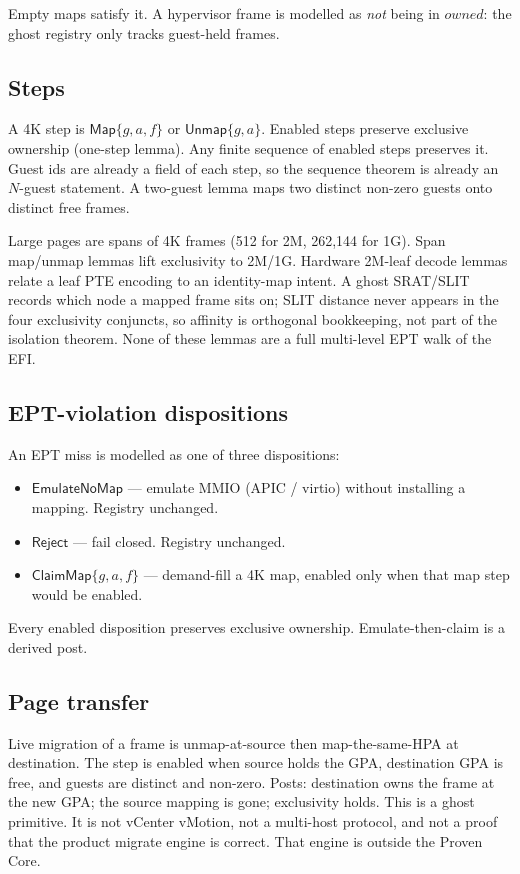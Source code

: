 \documentclass[sigplan,10pt,anonymous]{acmart}
\begin{document}
Empty maps satisfy it. A hypervisor frame is modelled as \emph{not} being
in $\mathit{owned}$: the ghost registry only tracks guest-held frames.

\subsection{Steps}

A 4K step is $\mathsf{Map}\{g,a,f\}$ or $\mathsf{Unmap}\{g,a\}$. Enabled
steps preserve exclusive ownership (one-step lemma). Any finite sequence of
enabled steps preserves it. Guest ids are already a field of each step, so
the sequence theorem is already an $N$-guest statement. A two-guest lemma
maps two distinct non-zero guests onto distinct free frames.

Large pages are spans of 4K frames (512 for 2M, 262{,}144 for 1G). Span
map/unmap lemmas lift exclusivity to 2M/1G. Hardware 2M-leaf decode lemmas
relate a leaf PTE encoding to an identity-map intent. A ghost SRAT/SLIT
records which node a mapped frame sits on; SLIT distance never appears in
the four exclusivity conjuncts, so affinity is orthogonal bookkeeping, not
part of the isolation theorem. None of these lemmas are a full multi-level
EPT walk of the EFI.

\subsection{EPT-violation dispositions}

An EPT miss is modelled as one of three dispositions:

\begin{itemize}
\item $\mathsf{EmulateNoMap}$ --- emulate MMIO (APIC / virtio) without
  installing a mapping. Registry unchanged.
\item $\mathsf{Reject}$ --- fail closed. Registry unchanged.
\item $\mathsf{ClaimMap}\{g,a,f\}$ --- demand-fill a 4K map, enabled only
  when that map step would be enabled.
\end{itemize}

Every enabled disposition preserves exclusive ownership. Emulate-then-claim
is a derived post.

\subsection{Page transfer}

Live migration of a frame is unmap-at-source then map-the-same-HPA at
destination. The step is enabled when source holds the GPA, destination GPA
is free, and guests are distinct and non-zero. Posts: destination owns the
frame at the new GPA; the source mapping is gone; exclusivity holds. This is a
ghost primitive. It is not vCenter vMotion, not a multi-host protocol, and
not a proof that the product migrate engine is correct. That engine is
outside the Proven Core.
\end{document}
